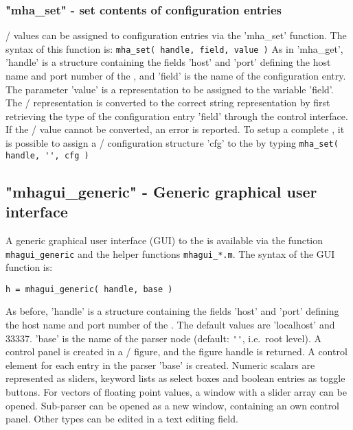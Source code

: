 \subsubsection{"mha\_set" - set contents of \mha{} configuration entries}

\Octave{}/\Matlab{} values can be assigned to \mha{} configuration entries via the
'mha\_set' function.
%
The syntax of this function is:
\verb!mha_set( handle, field, value )!
%
As in 'mha\_get', 'handle' is a structure containing the fields 'host'
and 'port' defining the host name and port number of the \mhad{}, and
'field' is the name of the \mha{} configuration entry.
%
The parameter 'value' is a \Matlab{} representation to be assigned to
the variable 'field'.
%
The \Octave{}/\Matlab{} representation is converted to the correct \mha{} string
representation by first retrieving the type of the configuration entry
'field' through the control interface.
%
If the \Octave{}/\Matlab{} value cannot be converted, an error is reported.
%
To setup a complete \mha{}, it is possible to assign a \Octave{}/\Matlab{}
configuration structure 'cfg' to the \mha{} by typing
\verb!mha_set( handle, '', cfg )!

\subsection{"mhagui\_generic" - Generic graphical user interface}
\label{sec:mhagui_generic}

A generic graphical user interface (GUI) to the \mhad{} is available
via the function \verb!mhagui_generic! and the helper functions
\verb!mhagui_*.m!.
%
The syntax of the GUI function is:
\begin{verbatim}
h = mhagui_generic( handle, base )
\end{verbatim}
%
As before, 'handle' is a structure containing the fields 'host' and
'port' defining the host name and port number of the \mhad{}. The
default values are 'localhost' and 33337.
%
'base' is the name of the \mha{} parser node (default: \verb!''!, i.e.\ root level).
%
A control panel is created in a \Octave{}/\Matlab{} figure, and the figure
handle is returned.
%
A control element for each entry in the parser 'base' is created.
%
Numeric scalars are represented as sliders, keyword lists as select
boxes and boolean entries as toggle buttons.
%
For vectors of floating point values, a window with a slider array can
be opened.
%
Sub-parser can be opened as a new window, containing an own control
panel.
%
Other types can be edited in a text editing field.

